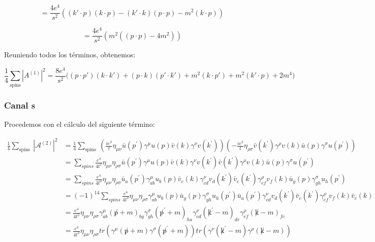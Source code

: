 \begin{equation}
= \frac{4e^4}{s^2} ((k' \cdot p)(k \cdot p) - (k' \cdot k) (p \cdot p) - m^2(k \cdot p))
\end{equation}

\begin{equation}
= \frac{4e^4}{s^2} (m^2 ((p \cdot p) - 4m^2))
\end{equation}

Reuniendo todos los términos, obtenemos:

\begin{equation}
\frac{1}{4} \sum_{\text{spins}} |A^{(1)}|^2 = \frac{8e^4}{s^2} \bigg( (p \cdot p')(k \cdot k') + (p \cdot k)(p' \cdot k') + m^2(k \cdot p') + m^2(k' \cdot p) + 2m^4 \bigg)
\end{equation}

\subsubsection{Canal s}
Procedemos con el cálculo del siguiente término:

\begin{equation}
  \begin{aligned}
  \frac{1}{4} \sum_{\text {spins }}\left|\mathcal{A}^{(2)}\right|^2 & =\frac{1}{4} \sum_{\text {spins }}\left(\frac{i e^2}{t} \eta_{\mu \nu} \bar{u}\left(p^{\prime}\right) \gamma^\mu u(p) \bar{v}(k) \gamma^\nu v\left(k^{\prime}\right)\right)\left(-\frac{i e^2}{t} \eta_{\rho \sigma} \bar{v}\left(k^{\prime}\right) \gamma^\rho v(k) \bar{u}(p) \gamma^\sigma u\left(p^{\prime}\right)\right) \\
  & =\sum_{s p i n s} \frac{e^4}{4 t^2} \eta_{\mu \nu} \eta_{\rho \sigma} \bar{u}\left(p^{\prime}\right) \gamma^\mu u(p) \bar{v}(k) \gamma^\nu v\left(k^{\prime}\right) \bar{v}\left(k^{\prime}\right) \gamma^\rho v(k) \bar{u}(p) \gamma^\sigma u\left(p^{\prime}\right) \\
  & =\sum_{s p i n s} \frac{e^4}{4 t^2} \eta_{\mu \nu} \eta_{\rho \sigma} \bar{u}_a\left(p^{\prime}\right) \gamma_{a b}^\mu u_b(p) \bar{v}_c(k) \gamma_{c d}^\nu v_d\left(k^{\prime}\right) \bar{v}_e\left(k^{\prime}\right) \gamma_{e f}^\rho v_f(k) \bar{u}_g(p) \gamma_{g h}^\sigma u_h\left(p^{\prime}\right) \\
  & =(-1)^{14} \sum_{s p i n s} \frac{e^4}{4 t^2} \eta_{\mu \nu} \eta_{\rho \sigma} \gamma_{a b}^\mu u_b(p) \bar{u}_g(p) \gamma_{g h}^\sigma u_h\left(p^{\prime}\right) \bar{u}_a\left(p^{\prime}\right) \gamma_{c d}^\nu v_d\left(k^{\prime}\right) \bar{v}_e\left(k^{\prime}\right) \gamma_{e f}^\rho v_f(k) \bar{v}_c(k) \\
  & =\frac{e^4}{4 t^2} \eta_{\mu \nu} \eta_{\rho \sigma} \gamma_{a b}^\mu(\not p+m)_{b g} \gamma_{g h}^\sigma\left(\not p^{\prime}+m\right)_{h a} \gamma_{c d}^\nu\left(\not k^{\prime}-m\right)_{d e} \gamma_{e f}^\rho(\not k-m)_{f c} \\
  & =\frac{e^4}{4 t^2} \eta_{\mu \nu} \eta_{\rho \sigma} t r\left(\gamma^\mu(\not p+m) \gamma^\sigma\left(\not p^{\prime}+m\right)\right) t r\left(\gamma^\nu\left(\not k^{\prime}-m\right) \gamma^\rho(\not k-m)\right)
  \end{aligned}
  \end{equation}


